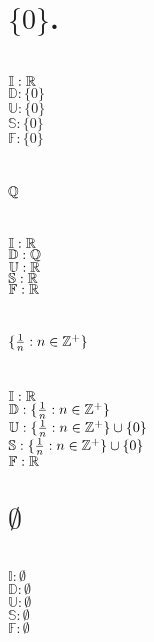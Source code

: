 \begin{parts}
 \part{$\{0\}$.}
 
 \begin{solution}
 \\$\mathbb{I}: \mathbb{R}$ \\
 $\mathbb{D}: \{0\}$ \\
 $\mathbb{U}: \{0\}$ \\
 $\mathbb{S}: \{0\}$ \\
 $\mathbb{F}: \{0\}$ \\
\end{solution}

 \part{$\mathbb{Q}$}
 
  \begin{solution}
 \\$\mathbb{I}: \mathbb{R}$ \\
 $\mathbb{D}: \mathbb{Q}$ \\
 $\mathbb{U}: \mathbb{R}$ \\
 $\mathbb{S}: \mathbb{R}$ \\
 $\mathbb{F}: \mathbb{R}$ \\
\end{solution}

 \part{$\{\frac{1}{n}:n \in \mathbb{Z}^+\}$}
 
  \begin{solution}
 \\$\mathbb{I}: \mathbb{R}$ \\
 $\mathbb{D}: \{\frac{1}{n}:n \in \mathbb{Z}^+\}$ \\
 $\mathbb{U}: \{\frac{1}{n}:n \in \mathbb{Z}^+\} \cup \{0\}$ \\
 $\mathbb{S}: \{\frac{1}{n}:n \in \mathbb{Z}^+\} \cup \{0\}$ \\
 $\mathbb{F}: \mathbb{R}$ \\
\end{solution}

 \part{$\emptyset$}
 
   \begin{solution}
 \\$\mathbb{I}: \emptyset$ \\
 $\mathbb{D}: \emptyset$ \\
 $\mathbb{U}: \emptyset$ \\
 $\mathbb{S}: \emptyset$ \\
 $\mathbb{F}: \emptyset$ \\
\end{solution}

\end{parts}

